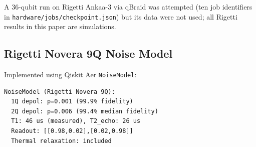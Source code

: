 \documentclass[conference]{IEEEtran}
\begin{document}
A 36-qubit run on Rigetti Ankaa-3 via qBraid was attempted (ten job identifiers in \texttt{hardware/jobs/checkpoint.json}) but its data were not used; all Rigetti results in this paper are simulations.

\subsection{Rigetti Novera 9Q Noise Model}

Implemented using Qiskit Aer \texttt{NoiseModel}:

{\small
\begin{verbatim}
NoiseModel (Rigetti Novera 9Q):
  1Q depol: p=0.001 (99.9% fidelity)
  2Q depol: p=0.006 (99.4% median fidelity)
  T1: 46 us (measured), T2_echo: 26 us
  Readout: [[0.98,0.02],[0.02,0.98]]
  Thermal relaxation: included
\end{verbatim}
}



\end{document}
